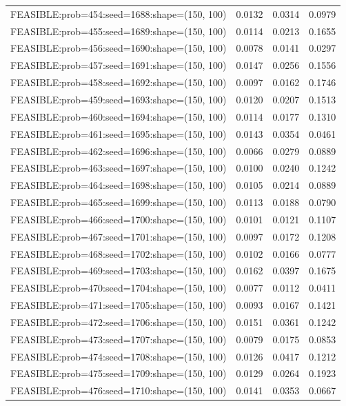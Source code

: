 \begin{longtable}{lccc}
FEASIBLE:prob=454:seed=1688:shape=(150, 100) & 0.0132 & 0.0314 & 0.0979 \\
FEASIBLE:prob=455:seed=1689:shape=(150, 100) & 0.0114 & 0.0213 & 0.1655 \\
FEASIBLE:prob=456:seed=1690:shape=(150, 100) & 0.0078 & 0.0141 & 0.0297 \\
FEASIBLE:prob=457:seed=1691:shape=(150, 100) & 0.0147 & 0.0256 & 0.1556 \\
FEASIBLE:prob=458:seed=1692:shape=(150, 100) & 0.0097 & 0.0162 & 0.1746 \\
FEASIBLE:prob=459:seed=1693:shape=(150, 100) & 0.0120 & 0.0207 & 0.1513 \\
FEASIBLE:prob=460:seed=1694:shape=(150, 100) & 0.0114 & 0.0177 & 0.1310 \\
FEASIBLE:prob=461:seed=1695:shape=(150, 100) & 0.0143 & 0.0354 & 0.0461 \\
FEASIBLE:prob=462:seed=1696:shape=(150, 100) & 0.0066 & 0.0279 & 0.0889 \\
FEASIBLE:prob=463:seed=1697:shape=(150, 100) & 0.0100 & 0.0240 & 0.1242 \\
FEASIBLE:prob=464:seed=1698:shape=(150, 100) & 0.0105 & 0.0214 & 0.0889 \\
FEASIBLE:prob=465:seed=1699:shape=(150, 100) & 0.0113 & 0.0188 & 0.0790 \\
FEASIBLE:prob=466:seed=1700:shape=(150, 100) & 0.0101 & 0.0121 & 0.1107 \\
FEASIBLE:prob=467:seed=1701:shape=(150, 100) & 0.0097 & 0.0172 & 0.1208 \\
FEASIBLE:prob=468:seed=1702:shape=(150, 100) & 0.0102 & 0.0166 & 0.0777 \\
FEASIBLE:prob=469:seed=1703:shape=(150, 100) & 0.0162 & 0.0397 & 0.1675 \\
FEASIBLE:prob=470:seed=1704:shape=(150, 100) & 0.0077 & 0.0112 & 0.0411 \\
FEASIBLE:prob=471:seed=1705:shape=(150, 100) & 0.0093 & 0.0167 & 0.1421 \\
FEASIBLE:prob=472:seed=1706:shape=(150, 100) & 0.0151 & 0.0361 & 0.1242 \\
FEASIBLE:prob=473:seed=1707:shape=(150, 100) & 0.0079 & 0.0175 & 0.0853 \\
FEASIBLE:prob=474:seed=1708:shape=(150, 100) & 0.0126 & 0.0417 & 0.1212 \\
FEASIBLE:prob=475:seed=1709:shape=(150, 100) & 0.0129 & 0.0264 & 0.1923 \\
FEASIBLE:prob=476:seed=1710:shape=(150, 100) & 0.0141 & 0.0353 & 0.0667 \\

\end{longtable}
